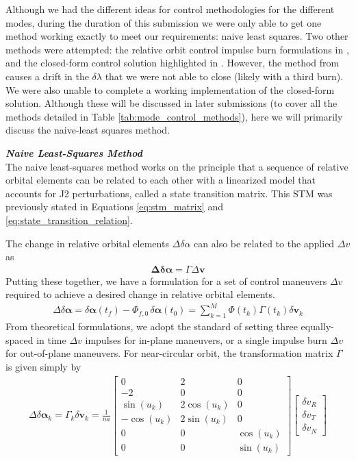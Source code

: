 Although we had the different ideas for control methodologies for the different modes, during the duration of this submission we were only able to get one method working exactly to meet our requirements: naive least squares. Two other methods were attempted: the relative orbit control impulse burn formulations in \cite{damicothesis}, and the closed-form control solution highlighted in \cite{chernick2021optimal}. However, the method from \cite{damicothesis} causes a drift in the $\delta \lambda$ that we were not able to close (likely with a third burn). We were also unable to complete a working implementation of the closed-form solution. Although these will be discussed in later submissions (to cover all the methods detailed in Table \ref{tab:mode_control_methods}), here we will primarily discuss the naive-least squares method.

\textit{\textbf{Naive Least-Squares Method}}\\
The naive least-squares method works on the principle that a sequence of relative orbital elements can be related to each other with a linearized model that accounts for J2 perturbations, called a state transition matrix. This STM was previously stated in Equations \ref{eq:stm_matrix} and \ref{eq:state_transition_relation}. 

The change in relative orbital elements $\Delta \delta \alpha$ can also be related to the applied $\Delta v$ as \cite{chernick2021optimal}
\begin{align}
    \boldsymbol{\Delta \delta \alpha} = \Gamma\Delta \boldsymbol{v}
\end{align} \label{eq:delta_v_to_alpha}
Putting these together, we have a formulation for a set of control maneuvers $\Delta v$ required to achieve a desired change in relative orbital elements.
\begin{align}
\Delta \delta \boldsymbol{\alpha} = \delta \boldsymbol{\alpha}(t_f) - \Phi_{f,0} \, \delta \boldsymbol{\alpha}(t_0)
= \sum_{k = 1}^{M} \Phi(t_k) \Gamma (t_k)  \delta \mathbf{v}_k 
\end{align} \label{eq:delta_v_to_delta_alpha}
From theoretical formulations, we adopt the standard of setting three equally-spaced in time $\Delta v$ impulses for in-plane maneuvers, or a single impulse burn $\Delta v$ for out-of-plane maneuvers.
For near-circular orbit, the transformation matrix $\Gamma$ is given simply by
\begin{align}
\Delta \delta \boldsymbol{\alpha}_k = \Gamma_k \delta \mathbf{v}_k = \frac{1}{na}
\begin{bmatrix}
0 & 2 & 0 \\
-2 & 0 & 0 \\
\sin(u_k) & 2\cos(u_k) & 0 \\
-\cos(u_k) & 2\sin(u_k) & 0 \\
0 & 0 & \cos(u_k) \\
0 & 0 & \sin(u_k)
\end{bmatrix}
\begin{bmatrix}
\delta v_R \\
\delta v_T \\
\delta v_N
\end{bmatrix}
\end{align}

